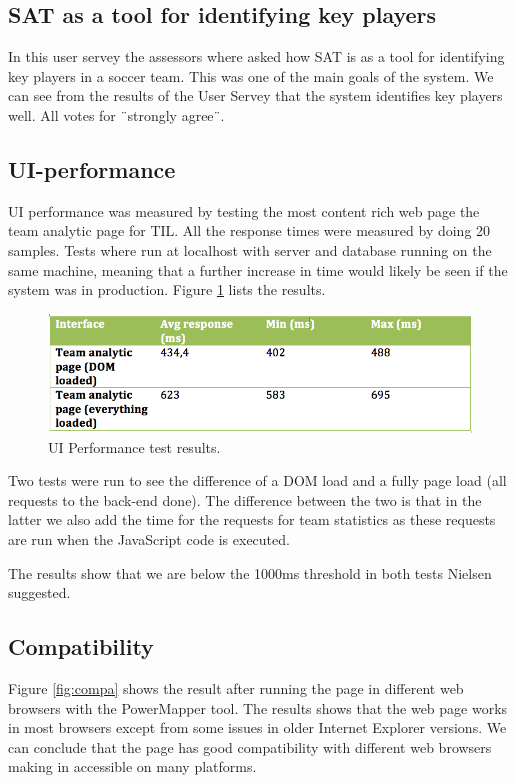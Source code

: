 \subsection{SAT as a tool for identifying key players}

In this user servey the assessors where asked how SAT is as a tool for identifying key players in a soccer team. This was one of the main goals of the system. We can see from the results of the User Servey that the system identifies key players well. All votes for ¨strongly agree¨. 

\subsection{UI-performance}
UI performance was measured by testing the most content rich web page the team analytic page for \ac{TIL}. All the response times were measured by doing 20 samples. Tests where run at localhost with server and database running on the same machine, meaning that a further increase in time would likely be seen if the system was in production. Figure \ref{fig:uiperform} lists the results.

\begin{figure}[ht!]
\centering
\includegraphics[width=1\textwidth]{images/evaluation/uipeform}
\caption{UI Performance test results. }
\label{fig:uiperform}
\end{figure}

Two tests were run to see the difference of a DOM load and a fully page load (all requests to the back-end done). The difference between the two is that in the latter we also add the time for the requests for team statistics as these requests are run when the JavaScript code is executed. 

The results show that we are below the 1000ms threshold in both tests Nielsen \cite{nielsen} suggested. 

\subsection{Compatibility}

Figure \ref{fig:compa} shows the result after running the page in different web browsers with the PowerMapper tool. The results shows that the web page works in most browsers except from some issues in older Internet Explorer versions. We can conclude that the page has good compatibility with different web browsers making in accessible on many platforms.

